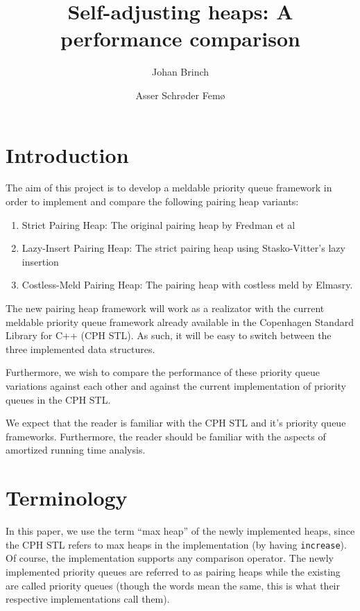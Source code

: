 \documentclass{DIKU-article}[2010/01/13]
\title{Self-adjusting heaps: A performance comparison}
\author{
Johan Brinch
\and
Asser Schrøder Femø
}
\institute{
Department of Computing, University of Copenhagen\\
Universitetsparken 1, DK-2100 Copenhagen East, Denmark\\
\email{zerrez@diku.dk}
\and
\email{asser@diku.dk}
}
\newcommand{\code}[1]{{\small\texttt{#1}}}
\begin{document}
\maketitle



\section{Introduction}

The aim of this project is to develop a meldable priority queue
framework in order to implement and compare the following pairing heap
variants:

\begin{enumerate}
\item Strict Pairing Heap: The original pairing heap by Fredman et
  al\cite{fredman}
\item Lazy-Insert Pairing Heap: The strict pairing heap using
  Stasko-Vitter's lazy insertion\cite{stasko}
\item Costless-Meld Pairing Heap: The pairing heap with costless meld
  by Elmasry\cite{elmasry}.
\end{enumerate}

The new pairing heap framework will work as a realizator with the
current meldable priority queue framework already available in the
Copenhagen Standard Library for C++ (CPH STL). As such, it will be
easy to switch between the three implemented data structures.

Furthermore, we wish to compare the performance of these priority
queue variations against each other and against the current
implementation of priority queues in the CPH STL.

We expect that the reader is familiar with the CPH STL and it's
priority queue frameworks\cite{cphstl-framework}. Furthermore, the
reader should be familiar with the aspects of amortized running time
analysis.



\section{Terminology}
In this paper, we use the term "`max heap"' of the newly implemented
heaps, since the CPH STL refers to max heaps in the implementation (by
having \code{increase}). Of course, the implementation supports any
comparison operator. The newly implemented priority queues are
referred to as pairing heaps while the existing are called priority
queues (though the words mean the same, this is what their respective
implementations call them).
\end{document}
